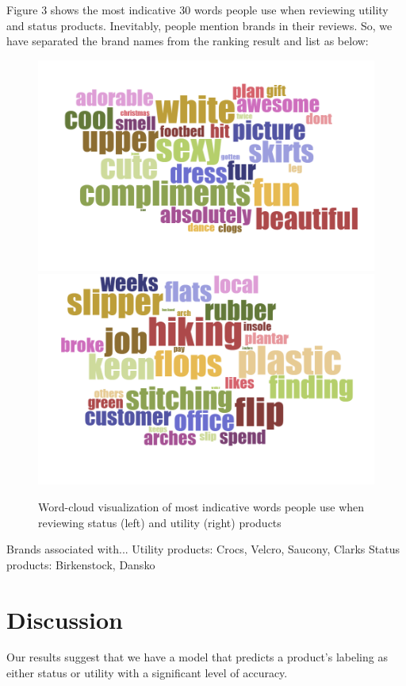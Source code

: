 \documentclass[dvips,12pt]{article}
\begin{document}
Figure 3 shows the most indicative 30 words people use when reviewing utility and status products. Inevitably, people mention brands in their reviews. So, we have separated the brand names from the ranking result and list as below:

\begin{figure}[h] \label{wordcloud}
	\includegraphics[scale=0.245]{Status}
	\includegraphics[scale=0.245]{Utility}
	\caption{Word-cloud visualization of most indicative words people use when reviewing status (left) and utility (right) products}
\end{figure}

Brands associated with...
Utility products: Crocs, Velcro, Saucony, Clarks
Status products: Birkenstock, Dansko


\section{Discussion}
Our results suggest that we have a model that predicts a product’s labeling as either status or utility with a significant level of accuracy.



{}

\end{document}
